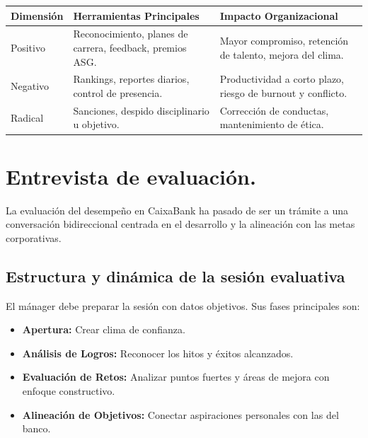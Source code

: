 \begin{table}[H]
\centering
\begin{tabular}{|p{3cm}|p{6cm}|p{6cm}|}
\hline
\textbf{Dimensión} & \textbf{Herramientas Principales} & \textbf{Impacto Organizacional} \\
\hline
Positivo & Reconocimiento, planes de carrera, feedback, premios ASG. & Mayor compromiso, retención de talento, mejora del clima. \\
\hline
Negativo & Rankings, reportes diarios, control de presencia. & Productividad a corto plazo, riesgo de burnout y conflicto. \\
\hline
Radical & Sanciones, despido disciplinario u objetivo. & Corrección de conductas, mantenimiento de ética. \\
\hline
\end{tabular}
\end{table}

\section{Entrevista de evaluación.} 
La evaluación del desempeño en CaixaBank ha pasado de ser un trámite a una conversación bidireccional centrada en el desarrollo y la alineación con las metas corporativas.

\subsection{Estructura y dinámica de la sesión evaluativa}
El mánager debe preparar la sesión con datos objetivos. Sus fases principales son:
\begin{itemize}[leftmargin=*]
    \item \textbf{Apertura:} Crear clima de confianza.
    \item \textbf{Análisis de Logros:} Reconocer los hitos y éxitos alcanzados.
    \item \textbf{Evaluación de Retos:} Analizar puntos fuertes y áreas de mejora con enfoque constructivo.
    \item \textbf{Alineación de Objetivos:} Conectar aspiraciones personales con las del banco.
\end{itemize}

